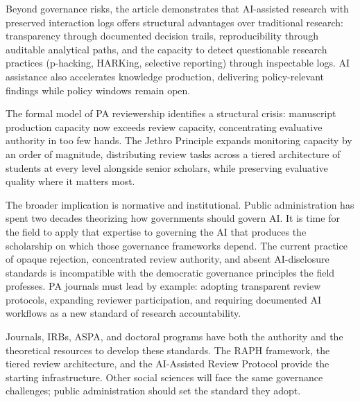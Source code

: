 \documentclass[12pt]{article}
\begin{document}
Beyond governance risks, the article demonstrates that AI-assisted research with preserved
interaction logs offers structural advantages over traditional research: transparency through documented decision trails, reproducibility through auditable
analytical paths, and the capacity to detect questionable research practices
(p-hacking, HARKing, selective reporting) through inspectable logs. AI assistance also
accelerates knowledge production, delivering policy-relevant findings while policy windows
remain open.

The formal model of PA reviewership identifies a structural crisis: manuscript production
capacity now exceeds review capacity, concentrating evaluative authority in too few hands.
The Jethro Principle expands monitoring capacity by an order of magnitude, distributing
review tasks across a tiered architecture of students at every level alongside senior
scholars, while preserving evaluative quality where it matters most.

The broader implication is normative and institutional. Public administration has spent two
decades theorizing how governments should govern AI. It is time for the field to apply that
expertise to governing the AI that produces the scholarship on which those governance
frameworks depend. The current practice of opaque rejection, concentrated review authority,
and absent AI-disclosure standards is incompatible with the democratic governance principles
the field professes. PA journals must lead by example: adopting transparent review protocols,
expanding reviewer participation, and requiring documented AI workflows as a new standard
of research accountability.

Journals, IRBs, ASPA, and doctoral programs have both the authority and the theoretical
resources to develop these standards. The RAPH framework, the tiered review architecture,
and the AI-Assisted Review Protocol provide the starting infrastructure. Other social
sciences will face the same governance challenges; public administration should set the
standard they adopt.
\end{document}
